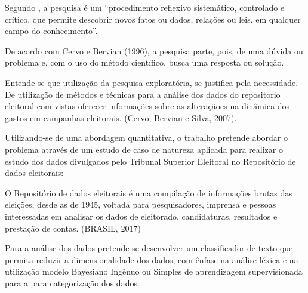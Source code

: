 \documentclass[
	12pt,				%
	openright,			%
	oneside,			%
	a4paper,			%
	english,			%
	french,				%
	spanish,			%
	brazil,				%
	]{abntex2}
\begin{document}
Segundo , a pesquisa é um “procedimento reflexivo sistemático, controlado e crítico, que permite descobrir novos fatos ou dados, relações ou leis, em qualquer campo do conhecimento”.

De acordo com Cervo e Bervian (1996), a pesquisa parte, pois, de uma dúvida ou problema e, com o uso do método científico, busca uma resposta ou solução.

Entende-se que utilização da pesquisa exploratória, se justifica pela necessidade. De utilização de métodos e técnicas para a análise dos dados do repositorio eleitoral com vistas oferecer informações sobre as alteraçãoes na dinâmica dos gastos em campanhas eleitorais. (Cervo, Bervian e Silva, 2007).

Utilizando-se de uma abordagem quantitativa, o trabalho pretende abordar o problema através de um estudo de caso de natureza aplicada para realizar o estudo dos dados divulgados pelo Tribunal Superior Eleitoral no Repositório de dados eleitorais:

\begin{citacao}
 O Repositório de dados eleitorais é uma compilação de informações brutas das eleições, desde as de 1945, voltada para pesquisadores, imprensa e pessoas interessadas em analisar os dados de eleitorado, candidaturas, resultados e prestação de contas. (BRASIL, 2017)
\end{citacao}

Para a análise dos dados pretende-se desenvolver um classificador de texto que permita reduzir a dimensionalidade dos dados, com ênfase na análise léxica e na utilização modelo Bayesiano Ingênuo ou Simples de aprendizagem supervisionada para a para categorização dos dados.




\postextual




\end{document}
